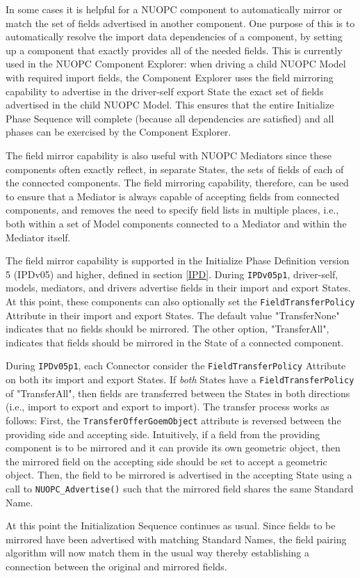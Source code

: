 %

\label{FieldMirror}

In some cases it is helpful for a NUOPC component to automatically mirror or match the set of fields advertised in another component.  One purpose of this is to automatically resolve the import data dependencies of a component, by setting up a component that exactly provides all of the needed fields.  This is currently used in the NUOPC Component Explorer:  when driving a child NUOPC Model with required import fields, the Component Explorer uses the field mirroring capability to advertise in the driver-self export State the exact set of fields advertised in the child NUOPC Model.  This ensures that the entire Initialize Phase Sequence will complete (because all dependencies are satisfied) and all phases can be exercised by the Component Explorer.

The field mirror capability is also useful with NUOPC Mediators since these components often exactly reflect, in separate States, the sets of fields of each of the connected components.  The field mirroring capability, therefore, can be used to ensure that a Mediator is always capable of accepting fields from connected components, and removes the need to specify field lists in multiple places, i.e., both within a set of Model components connected to a Mediator and within the Mediator itself.

The field mirror capability is supported in the Initialize Phase Definition version 5 (IPDv05) and higher, defined in section \ref{IPD}.  During {\tt IPDv05p1}, driver-self, models, mediators, and drivers advertise fields in their import and export States.  At this point, these components can also optionally set the {\tt FieldTransferPolicy} Attribute in their import and export States.  The default value "TransferNone" indicates that no fields should be mirrored.  The other option, "TransferAll", indicates that fields should be mirrored in the State of a connected component.

During {\tt IPDv05p1}, each Connector consider the {\tt FieldTransferPolicy} Attribute on both its import and export States.  If {\em both} States have a {\tt FieldTransferPolicy} of "TransferAll", then fields are transferred between the States in both directions (i.e., import to export and export to import).  The transfer process works as follows:  First, the {\tt TransferOfferGoemObject} attribute is reversed between the providing side and accepting side.  Intuitively, if a field from the providing component is to be mirrored and it can provide its own geometric object, then the mirrored field on the accepting side should be set to accept a geometric object.  Then, the field to be mirrored is advertised in the accepting State using a call to {\tt NUOPC\_Advertise()} such that the mirrored field shares the same Standard Name.

At this point the Initialization Sequence continues as usual.  Since fields to be mirrored have been advertised with matching Standard Names, the field pairing algorithm will now match them in the usual way thereby establishing a connection between the original and mirrored fields.
